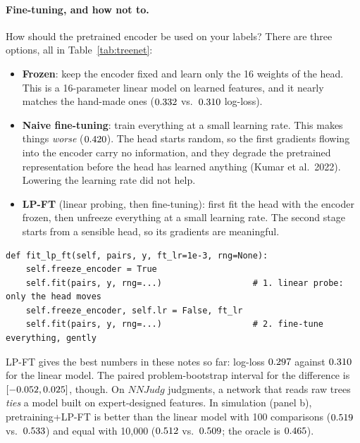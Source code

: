 \documentclass[11pt]{article}
\theoremstyle{definition}
\theoremstyle{plain}
\theoremstyle{remark}
\renewcommand{\_}{\oldunderscore\allowbreak}
\newcommand{\file}[1]{\textcolor{blue!50!black}{\texttt{#1}}}
\newcommand{\codefrom}[1]{\par\smallskip\noindent{\footnotesize\textbf{From} \file{#1}}}
\begin{document}
\paragraph{Fine-tuning, and how not to.}
How should the pretrained encoder be used on your labels? There are three options, all in Table~\ref{tab:treenet}:
\begin{itemize}[nosep]
\item \textbf{Frozen}: keep the encoder fixed and learn only the 16 weights of the head. This is a 16-parameter linear model on learned features, and it nearly matches the
  hand-made ones ($0.332$ vs.\ $0.310$ log-loss).
\item \textbf{Naive fine-tuning}: train everything at a small learning rate. This makes things \emph{worse} ($0.420$). The head starts random, so the first gradients flowing into the
  encoder carry no information, and they degrade the pretrained representation before the head has learned anything (Kumar et al.\ 2022). Lowering the
  learning rate did not help.
\item \textbf{LP-FT} (linear probing, then fine-tuning): first fit the head with the encoder frozen, then unfreeze everything at a small learning rate. The second stage starts from a
  sensible head, so its gradients are meaningful.
\end{itemize}

\codefrom{src/calcdiff/models/tree\_net.py}
\begin{lstlisting}
def fit_lp_ft(self, pairs, y, ft_lr=1e-3, rng=None):
    self.freeze_encoder = True
    self.fit(pairs, y, rng=...)                  # 1. linear probe: only the head moves
    self.freeze_encoder, self.lr = False, ft_lr
    self.fit(pairs, y, rng=...)                  # 2. fine-tune everything, gently
\end{lstlisting}

\begin{table}[h]\centering\small

\caption{Out-of-fold results on your $\NNJudg$ judgments (5-fold CV over problems, 3 repeats).}\label{tab:treenet}
\end{table}

LP-FT gives the best numbers in these notes so far: log-loss $0.297$ against $0.310$ for the linear model. The paired problem-bootstrap interval for the difference is
$[-0.052,0.025]$, though. On $NNJudg$ judgments, a network that reads raw trees \emph{ties} a model built on expert-designed features. In simulation (panel b),
pretraining+LP-FT is better than the linear model with 100 comparisons ($0.519$ vs.\ $0.533$) and equal with 10{,}000 ($0.512$ vs.\ $0.509$; the oracle is $0.465$).
\end{document}
